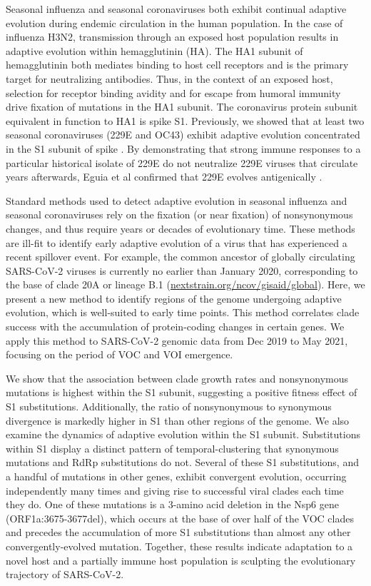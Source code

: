 \documentclass[11pt,oneside,letterpaper]{article}
\begin{document}
Seasonal influenza and seasonal coronaviruses both exhibit continual adaptive evolution during endemic circulation in the human population.
In the case of influenza H3N2, transmission through an exposed host population results in adaptive evolution within hemagglutinin (HA).
The HA1 subunit of hemagglutinin both mediates binding to host cell receptors and is the primary target for neutralizing antibodies.
Thus, in the context of an exposed host, selection for receptor binding avidity \cite{Hensley2009-at} and for escape from humoral immunity \cite{Bedford2014-rg} drive fixation of mutations in the HA1 subunit.
The coronavirus protein subunit equivalent in function to HA1 is spike S1.
Previously, we showed that at least two seasonal coronaviruses (229E and OC43) exhibit adaptive evolution concentrated in the S1 subunit of spike \cite{Kistler2021-va}.
By demonstrating that strong immune responses to a particular historical isolate of 229E do not neutralize 229E viruses that circulate years afterwards, Eguia et al confirmed that 229E evolves antigenically \cite{Eguia_2021}.

Standard methods used to detect adaptive evolution in seasonal influenza and seasonal coronaviruses rely on the fixation (or near fixation) of nonsynonymous changes, and thus require years or decades of evolutionary time.
These methods are ill-fit to identify early adaptive evolution of a virus that has experienced a recent spillover event.
For example, the common ancestor of globally circulating SARS-CoV-2 viruses is currently no earlier than January 2020, corresponding to the base of clade 20A or lineage B.1 (\href{https://nextstrain.org/ncov/gisaid/global}{nextstrain.org/ncov/gisaid/global}).
Here, we present a new method to identify regions of the genome undergoing adaptive evolution, which is well-suited to early time points.
This method correlates clade success with the accumulation of protein-coding changes in certain genes.
We apply this method to SARS-CoV-2 genomic data from Dec 2019 to May 2021, focusing on the period of VOC and VOI emergence.

We show that the association between clade growth rates and nonsynonymous mutations is highest within the S1 subunit, suggesting a positive fitness effect of S1 substitutions.
Additionally, the ratio of nonsynonymous to synonymous divergence is markedly higher in S1 than other regions of the genome.
We also examine the dynamics of adaptive evolution within the S1 subunit. Substitutions within S1 display a distinct pattern of temporal-clustering that synonymous mutations and RdRp substitutions do not.
Several of these S1 substitutions, and a handful of mutations in other genes, exhibit convergent evolution, occurring independently many times and giving rise to successful viral clades each time they do.
One of these mutations is a 3-amino acid deletion in the Nsp6 gene (ORF1a:3675-3677del), which occurs at the base of over half of the VOC clades and precedes the accumulation of more S1 substitutions than almost any other convergently-evolved mutation.
Together, these results indicate adaptation to a novel host and a partially immune host population is sculpting the evolutionary trajectory of SARS-CoV-2.
\end{document}
